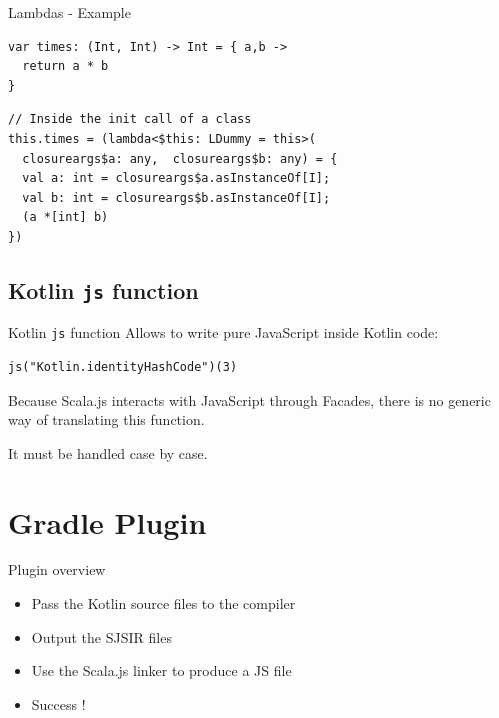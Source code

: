 \documentclass[10pt]{beamer}
\newcommand{\inlinecode}[2]{\colorbox{minted-bg}{\lstinline[language=#1]$#2$}}
\newcommand{\ktinline}[1]{\inlinecode{kotlin}{#1}}
\begin{document}
\begin{frame}[fragile]{Lambdas - Example}
 \begin{verbatim}
var times: (Int, Int) -> Int = { a,b ->
  return a * b
}
 \end{verbatim}
 \begin{verbatim}
// Inside the init call of a class
this.times = (lambda<$this: LDummy = this>(
  closureargs$a: any,  closureargs$b: any) = {
  val a: int = closureargs$a.asInstanceOf[I];
  val b: int = closureargs$b.asInstanceOf[I];
  (a *[int] b)
})
 \end{verbatim}
 
\end{frame}
 

\subsection{Kotlin \ktinline{js} function}

\begin{frame}[fragile]{Kotlin \ktinline{js} function}
  Allows to write pure JavaScript inside Kotlin code:
  
  \begin{verbatim}
js("Kotlin.identityHashCode")(3)
  \end{verbatim}

  Because Scala.js interacts with JavaScript through Facades, there is no generic way of translating this function.
  
  It must be handled case by case.

\end{frame}



\section{Gradle Plugin}

\begin{frame}{Plugin overview}
 \begin{itemize}
  \item Pass the Kotlin source files to the compiler
  \item Output the SJSIR files
  \item Use the Scala.js linker to produce a JS file
  \item Success !
 \end{itemize}

\end{frame}
\end{document}
